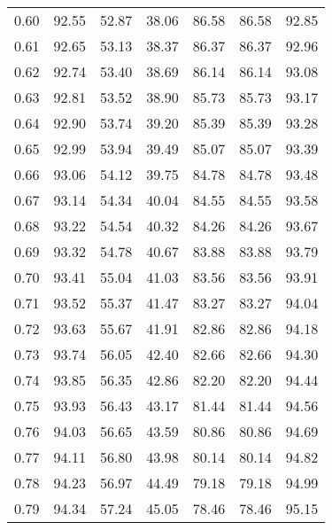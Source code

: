 \begin{tabular}{|c|c|c|c|c|c|c|}
      0.60 &     92.55 &     52.87 &      38.06 &   86.58 &      86.58 &         92.85 \\
      0.61 &     92.65 &     53.13 &      38.37 &   86.37 &      86.37 &         92.96 \\
      0.62 &     92.74 &     53.40 &      38.69 &   86.14 &      86.14 &         93.08 \\
      0.63 &     92.81 &     53.52 &      38.90 &   85.73 &      85.73 &         93.17 \\
      0.64 &     92.90 &     53.74 &      39.20 &   85.39 &      85.39 &         93.28 \\
      0.65 &     92.99 &     53.94 &      39.49 &   85.07 &      85.07 &         93.39 \\
      0.66 &     93.06 &     54.12 &      39.75 &   84.78 &      84.78 &         93.48 \\
      0.67 &     93.14 &     54.34 &      40.04 &   84.55 &      84.55 &         93.58 \\
      0.68 &     93.22 &     54.54 &      40.32 &   84.26 &      84.26 &         93.67 \\
      0.69 &     93.32 &     54.78 &      40.67 &   83.88 &      83.88 &         93.79 \\
      0.70 &     93.41 &     55.04 &      41.03 &   83.56 &      83.56 &         93.91 \\
      0.71 &     93.52 &     55.37 &      41.47 &   83.27 &      83.27 &         94.04 \\
      0.72 &     93.63 &     55.67 &      41.91 &   82.86 &      82.86 &         94.18 \\
      0.73 &     93.74 &     56.05 &      42.40 &   82.66 &      82.66 &         94.30 \\
      0.74 &     93.85 &     56.35 &      42.86 &   82.20 &      82.20 &         94.44 \\
      0.75 &     93.93 &     56.43 &      43.17 &   81.44 &      81.44 &         94.56 \\
      0.76 &     94.03 &     56.65 &      43.59 &   80.86 &      80.86 &         94.69 \\
      0.77 &     94.11 &     56.80 &      43.98 &   80.14 &      80.14 &         94.82 \\
      0.78 &     94.23 &     56.97 &      44.49 &   79.18 &      79.18 &         94.99 \\
      0.79 &     94.34 &     57.24 &      45.05 &   78.46 &      78.46 &         95.15 \\

\end{tabular}
